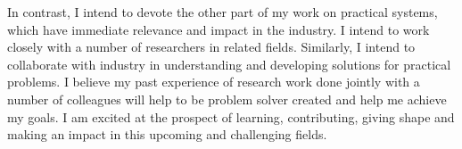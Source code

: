 \documentclass[a4paper, 11pt]{article}
\begin{document}
\begin{small}
In contrast, I intend to devote the other part of my work on practical systems, which have immediate relevance and impact in the industry.
I intend to work closely with a number of researchers in related fields. Similarly, I intend to collaborate with industry in understanding and developing solutions for practical problems.
I believe my past experience of research work done jointly with a number of colleagues
will help to be problem solver created and %
help me achieve my goals. I am excited at the prospect of learning, contributing, giving shape and making an impact in this upcoming and challenging fields.  



\end{small}


\end{document}
